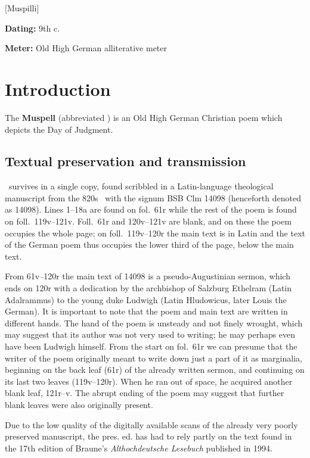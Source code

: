 [Muspilli]

\begin{flushright}%
\textbf{Dating:} 9th c.

\textbf{Meter:} Old High German alliterative meter
\end{flushright}%

\section{Introduction}

The \textbf{Muspell} (abbreviated \Muspilli) is an Old High German Christian poem which depicts the Day of Judgment.

\subsection{Textual preservation and transmission}

\Muspilli\ survives in a single copy, found scribbled in a Latin-language theological manuscript from the 820s \ce\ with the signum BSB Clm 14098 (henceforth denoted as 14098).  Lines 1--18a are found on fol.~61r while the rest of the poem is found on foll.~119v--121v.  Foll.~61r and 120v--121v are blank, and on these the poem occupies the whole page; on foll.~119v--120r the main text is in Latin and the text of the German poem thus occupies the lower third of the page, below the main text.

From 61v--120r the main text of 14098 is a pseudo-Augustinian sermon, which ends on 120r with a dedication by the archbishop of Salzburg Ethelram (Latin \textlatin{Adalrammus}) to the young duke Ludwigh (Latin \textlatin{Hludowicus}, later Louis the German).  It is important to note that the poem and main text are written in different hands.  The hand of the poem is unsteady and not finely wrought, which may suggest that its author was not very used to writing; he may perhaps even have been Ludwigh himself.  From the start on fol.~61r we can presume that the writer of the poem originally meant to write down just a part of it as marginalia, beginning on the back leaf (61r) of the already written sermon, and continuing on its last two leaves (119v--120r).  When he ran out of space, he acquired another blank leaf, 121r--v.  The abrupt ending of the poem may suggest that further blank leaves were also originally present.

Due to the low quality of the digitally available scans of the already very poorly preserved manuscript, the pres. ed. has had to rely partly on the text found in the 17th edition of Braune’s \emph{Althochdeutsche Lesebuch} published in 1994.%

